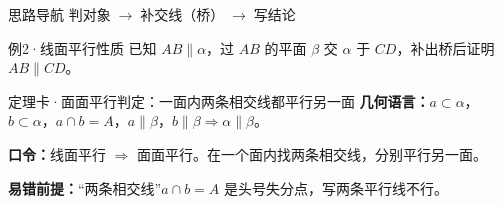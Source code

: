 \documentclass{exam-zh}
\begin{document}
\begin{eduAuxItem}{思路导航}
判对象$\;\to\;$补交线（桥）$\;\to\;$写结论\end{eduAuxItem}




\begin{eduSubQuestionItem}{例2·线面平行性质}
已知 $AB\parallel\alpha$，过 $AB$ 的平面 $\beta$ 交 $\alpha$ 于 $CD$，补出桥后证明 $AB\parallel CD$。\end{eduSubQuestionItem}

\begin{eduDualExplain}
  \begin{eduExplainLeft}
  \end{eduExplainLeft}

  \begin{eduExplainRight}
  \end{eduExplainRight}
\end{eduDualExplain}





\begin{eduSolutionBox}{定理卡·面面平行判定：一面内两条相交线都平行另一面}
  \begingroup
  \setlength{\parskip}{2.5mm}
\textbf{几何语言：}$a\subset\alpha$，$b\subset\alpha$，$a\cap b=A$，$a\parallel\beta$，$b\parallel\beta\Rightarrow\alpha\parallel\beta$。\par
\textbf{口令：}线面平行 $\Rightarrow$ 面面平行。在一个面内找两条相交线，分别平行另一面。\par
\textbf{易错前提：}“两条相交线”$a\cap b=A$ 是头号失分点，写两条平行线不行。\par
  \endgroup
\end{eduSolutionBox}
\end{document}
